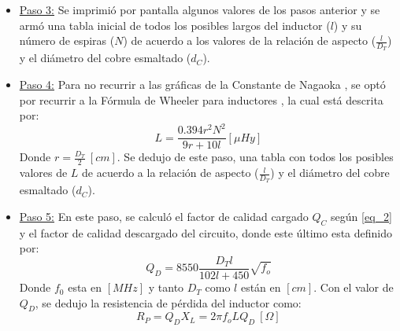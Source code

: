 \documentclass[conference]{IEEEtran}
\begin{document}
\begin{itemize}
\begin{itemize}
        \item \underline{Largo del inductor ($l$):} Conociendo a $D_{T}$ y a $\frac{l}{D_{T}}$, se despejó fácilmente el largo del inductor como:
        \begin{equation}
            l = \left(\frac{l}{D_{T}}\right) D_{T}
            \label{eq_14}
        \end{equation}
        
        \item \underline{Numero de espiras ($N$):} Se utilizó la siguiente fórmula para deducir el número de espiras:
        \begin{equation}
            N = \frac{l}{2d_{C}}
            \label{eq_15}
        \end{equation}
    \end{itemize}

    \item \underline{Paso 3:} Se imprimió por pantalla algunos valores de los pasos anterior y se armó una tabla inicial de todos los posibles largos del inductor ($l$) y su número de espiras ($N$) de acuerdo a los valores de la relación de aspecto ($\frac{l}{D_T}$) y el diámetro del cobre esmaltado ($d_{C}$).

    \item \underline{Paso 4:} Para no recurrir a las gráficas de la Constante de Nagaoka \cite{B4}, se optó por recurrir a la Fórmula de Wheeler para inductores \cite{B5}, la cual está descrita por:
    \begin{equation}
        L = \frac{0.394 r^{2} N^{2}}{9r + 10l} [\mu Hy]
        \label{eq_16}
    \end{equation}
    Donde $r = \frac{D_{T}}{2} \ [cm]$. Se dedujo de este paso, una tabla con todos los posibles valores de $L$ de acuerdo a la relación de aspecto ($\frac{l}{D_T}$) y el diámetro del cobre esmaltado ($d_{C}$).
    
    \item \underline{Paso 5:} En este paso, se calculó el factor de calidad cargado $Q_{C}$ según \eqref{eq_2} y el factor de calidad descargado del circuito, donde este último esta definido por:
    \begin{equation}
        Q_{D} = 8550 \frac{D_{T} l}{102l + 450} \sqrt{f_{o}}
        \label{eq_17}
    \end{equation}
    Donde $f_{0}$ esta en $[MHz]$ y tanto $D_{T}$ como $l$ están en $[cm]$. Con el valor de $Q_{D}$, se dedujo la resistencia de pérdida del inductor como:
    \begin{equation}
        R_{P} = Q_{D} X_{L} = 2 \pi f_{o} L Q_{D} \ [\Omega]
        \label{eq_18}
    \end{equation}


\end{itemize}
\end{document}
